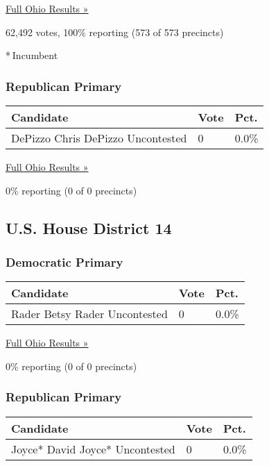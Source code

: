 \href{https://www.nytimes3xbfgragh.onion/elections/results/ohio}{Full
Ohio Results »}

62,492 votes, 100\% reporting (573 of 573 precincts)

* Incumbent

\hypertarget{republican-primary-14}{%
\subsubsection{Republican Primary}\label{republican-primary-14}}

\begin{longtable}[]{@{}lll@{}}
\toprule
Candidate & Vote & Pct.\tabularnewline
\midrule
\endhead
 DePizzo Chris DePizzo Uncontested & 0 & 0.0\%\tabularnewline
\bottomrule
\end{longtable}

\href{https://www.nytimes3xbfgragh.onion/elections/results/ohio}{Full
Ohio Results »}

0\% reporting (0 of 0 precincts)

\hypertarget{us-house-district-14}{%
\subsection{U.S. House District 14}\label{us-house-district-14}}

\hypertarget{democratic-primary-15}{%
\subsubsection{Democratic Primary}\label{democratic-primary-15}}

\begin{longtable}[]{@{}lll@{}}
\toprule
Candidate & Vote & Pct.\tabularnewline
\midrule
\endhead
 Rader Betsy Rader Uncontested & 0 & 0.0\%\tabularnewline
\bottomrule
\end{longtable}

\href{https://www.nytimes3xbfgragh.onion/elections/results/ohio}{Full
Ohio Results »}

0\% reporting (0 of 0 precincts)

\hypertarget{republican-primary-15}{%
\subsubsection{Republican Primary}\label{republican-primary-15}}

\begin{longtable}[]{@{}lll@{}}
\toprule
Candidate & Vote & Pct.\tabularnewline
\midrule
\endhead
 Joyce* David Joyce* Uncontested & 0 & 0.0\%\tabularnewline
\bottomrule
\end{longtable}

